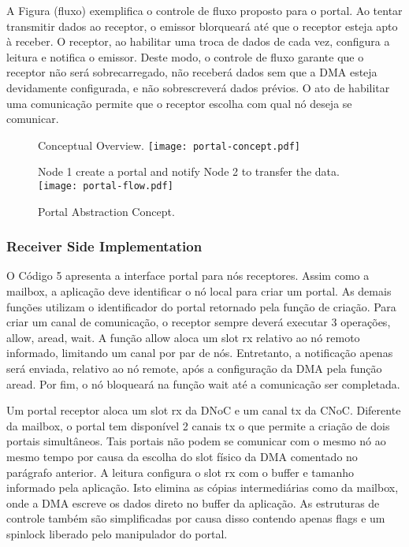 			A Figura (fluxo) exemplifica o controle de fluxo proposto para o portal.
			Ao tentar transmitir dados ao receptor, o emissor blorqueará até que o receptor esteja apto à receber.
			O receptor, ao habilitar uma troca de dados de cada vez, configura a leitura e notifica o emissor.
			Deste modo, o controle de fluxo garante que o receptor não será sobrecarregado, não receberá dados sem que a DMA esteja devidamente configurada, e não sobrescreverá dados prévios.
			O ato de habilitar uma comunicação permite que o receptor escolha com qual nó deseja se comunicar.


			\begin{figure}[!tb]
				\centering%
				\caption{Portal Abstraction Concept.}%
				\label{fig:portal}%

					{Conceptual Overview.}%
					{\texttt{[image: portal-concept.pdf]}}%

				\hfill

					{Node 1 create a portal and notify Node 2 to transfer the data.}%
					{\texttt{[image: portal-flow.pdf]}}%

			\end{figure}

			\subsubsection{Receiver Side Implementation}

				O Código 5 apresenta a interface portal para nós receptores.
				Assim como a mailbox, a aplicação deve identificar o nó local para criar um portal.
				As demais funções utilizam o identificador do portal retornado pela função de criação.
				Para criar um canal de comunicação, o receptor sempre deverá executar 3 operações, allow, aread, wait.
				A função allow aloca um slot rx relativo ao nó remoto informado, limitando um canal por par de nós.
				Entretanto, a notificação apenas será enviada, relativo ao nó remote, após a configuração da DMA pela função aread.
				Por fim, o nó bloqueará na função wait até a comunicação ser completada.

				Um portal receptor aloca um slot rx da DNoC e um canal tx da CNoC.
				Diferente da mailbox, o portal tem disponível 2 canais tx o que permite a criação de dois portais simultâneos.
				Tais portais não podem se comunicar com o mesmo nó ao mesmo tempo por causa da escolha do slot físico da DMA comentado no parágrafo anterior.
				A leitura configura o slot rx com o buffer e tamanho informado pela aplicação.
				Isto elimina as cópias intermediárias como da mailbox, onde a DMA escreve os dados direto no buffer da aplicação.
				As estruturas de controle também são simplificadas por causa disso
				contendo apenas flags e um spinlock liberado pelo manipulador do portal.

